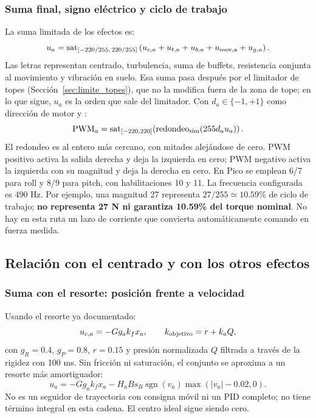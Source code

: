 \subsubsection{Suma final, signo eléctrico y ciclo de trabajo}
La suma limitada de los efectos es:
\begin{equation}
u_a=\operatorname{sat}_{[-220/255,\,220/255]}
\left(u_{c,a}+u_{t,a}+u_{b,a}+u_{\rm mov,a}+u_{g,a}\right).
\end{equation}
Las letras representan centrado, turbulencia, suma de buffets, resistencia conjunta al movimiento y vibración en suelo. Esa suma pasa después por el limitador de topes (Sección~\ref{sec:limite_topes}), que no la modifica fuera de la zona de tope; en lo que sigue, $u_a$ es la orden que sale del limitador. Con $d_a\in\{-1,+1\}$ como dirección de motor y :
\begin{equation}
\mathrm{PWM}_a=\operatorname{sat}_{[-220,220]}\!\left(\operatorname{redondeo}_{\rm sim}(255d_au_a)\right).
\end{equation}
El redondeo es al entero más cercano, con mitades alejándose de cero. PWM positivo activa la salida derecha y deja la izquierda en cero; PWM negativo activa la izquierda con su magnitud y deja la derecha en cero. En Pico se emplean 6/7 para roll y 8/9 para pitch, con habilitaciones 10 y 11. La frecuencia configurada es 490 Hz. Por ejemplo, una magnitud 27 representa $27/255\simeq10.59\%$ de ciclo de trabajo; \textbf{no representa 27 N ni garantiza 10.59\% del torque nominal}. No hay en esta ruta un lazo de corriente que convierta automáticamente comando en fuerza medida.

\subsection{Relación con el centrado y con los otros efectos}
\subsubsection{Suma con el resorte: posición frente a velocidad}
Usando el resorte ya documentado:
\begin{equation}
u_{c,a}=-Gg_ak_fx_a,\qquad
k_{\rm objetivo}=r+k_aQ,
\end{equation}
con $g_R=0.4$, $g_P=0.8$, $r=0.15$ y presión normalizada $Q$ filtrada a través de la rigidez con 100 ms. Sin fricción ni saturación, el conjunto se aproxima a un resorte más amortiguador:
\begin{equation}
u_a=-Gg_ak_fx_a-H_aBs_B\operatorname{sgn}(v_a)\max(|v_a|-0.02,0).
\end{equation}
No es un seguidor de trayectoria con consigna móvil ni un PID completo; no tiene término integral en esta cadena. El centro ideal sigue siendo cero.

